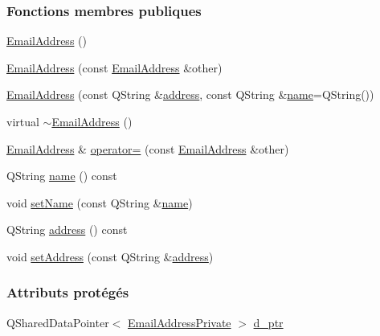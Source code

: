 \subsubsection*{Fonctions membres publiques}
\begin{DoxyCompactItemize}
\item 
\hyperlink{class_simple_mail_1_1_email_address_a6d295effd1195009a2c744c67ff270e9}{Email\+Address} ()
\item 
\hyperlink{class_simple_mail_1_1_email_address_a937f1030d9894fbf8dad50ca57833b7c}{Email\+Address} (const \hyperlink{class_simple_mail_1_1_email_address}{Email\+Address} \&other)
\item 
\hyperlink{class_simple_mail_1_1_email_address_a8bfbbe6dbdc1f420a7e6c7e52468bd54}{Email\+Address} (const Q\+String \&\hyperlink{class_simple_mail_1_1_email_address_a426faf41f9f1c56014a97eec4d37ba4a}{address}, const Q\+String \&\hyperlink{class_simple_mail_1_1_email_address_a311fdcf9bc548a3db4a985b396ab5355}{name}=Q\+String())
\item 
virtual \hyperlink{class_simple_mail_1_1_email_address_a360542a2ad94a7f484f85557f0b53321}{$\sim$\+Email\+Address} ()
\item 
\hyperlink{class_simple_mail_1_1_email_address}{Email\+Address} \& \hyperlink{class_simple_mail_1_1_email_address_a833afb6d4b354bddffa26fd71c70fc2e}{operator=} (const \hyperlink{class_simple_mail_1_1_email_address}{Email\+Address} \&other)
\item 
Q\+String \hyperlink{class_simple_mail_1_1_email_address_a311fdcf9bc548a3db4a985b396ab5355}{name} () const
\item 
void \hyperlink{class_simple_mail_1_1_email_address_a09d30bfa2caf56202f78bbc5f7ed543e}{set\+Name} (const Q\+String \&\hyperlink{class_simple_mail_1_1_email_address_a311fdcf9bc548a3db4a985b396ab5355}{name})
\item 
Q\+String \hyperlink{class_simple_mail_1_1_email_address_a426faf41f9f1c56014a97eec4d37ba4a}{address} () const
\item 
void \hyperlink{class_simple_mail_1_1_email_address_aab4a5642e2779dce05aafd267d5729ae}{set\+Address} (const Q\+String \&\hyperlink{class_simple_mail_1_1_email_address_a426faf41f9f1c56014a97eec4d37ba4a}{address})
\end{DoxyCompactItemize}
\subsubsection*{Attributs protégés}
\begin{DoxyCompactItemize}
\item 
Q\+Shared\+Data\+Pointer$<$ \hyperlink{class_simple_mail_1_1_email_address_private}{Email\+Address\+Private} $>$ \hyperlink{class_simple_mail_1_1_email_address_a27188c75c77a942e79cac0420788f214}{d\+\_\+ptr}
\end{DoxyCompactItemize}
